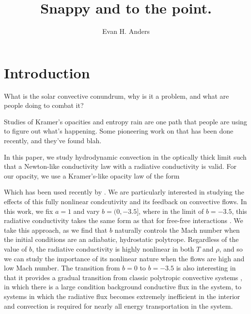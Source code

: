 \documentclass[twocolumn, amsmath, amsfonts, amssymb]{aastex62}
\begin{document}
\title{Snappy and to the point.}


\author{Evan H. Anders}


\begin{abstract}
\end{abstract}


\section{Introduction} \label{sec:intro}
What is the solar convective conundrum, why is it a problem, and what are people
doing to combat it?

Studies of Kramer's opacities and entropy rain are one path that people are using
to figure out what's happening. Some pioneering work on that has been done
recently, and they've found blah.

In this paper, we study hydrodynamic convection in the optically thick
limit such that a Newton-like conductivity law with a radiative conductivity
is valid. For our opacity, we use a Kramer's-like opacity law of the form


Which has been used recently by \cite{kapyla&all2017, kapyla&all2018}. We are particularly interested in studying
the effects of this fully nonlinear condcutivity and its feedback on convective
flows. In this work, we fix $a = 1$ and
vary $b = (0, -3.5]$, where in the limit of $b = -3.5$, this radiative conductivity
takes the same form as that for free-free interactions
\citep{Cox&Giuli}. We take this approach,
as we find that $b$ naturally controls the Mach number when the initial conditions
are an adiabatic, hydrostatic polytrope. Regardless of the value of $b$, the
radiative conductivity is highly nonlinear in both $T$ and $\rho$, and so we
can study the importance of its nonlinear nature when the flows are high and
low Mach number. The transition from $b = 0$ to $b = -3.5$ is also interesting
in that it provides a gradual transition from classic polytropic convective
systems \citep{hurlburt&all1984, brandenburg&all2005, anders&brown2017}, in
which there is a large condition background conductive flux in the system,
to systems in which the radiative flux becomes extremely inefficient in the
interior and convection is required for nearly all energy transportation
in the system.
\end{document}
